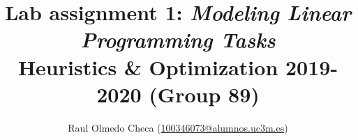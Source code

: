 \documentclass[a4paper,usenames,dvipsnames,table]{report}
\begin{document}
\title{
    {\Huge \textbf{Lab assignment 1: \textit{Modeling Linear Programming Tasks}\\}}
    {\small Heuristics \& Optimization 2019-2020 (Group 89)}
}
\author{
    Raul Olmedo Checa ({\normalsize \href{mailto:100346073@alumnos.uc3m.es}{100346073@alumnos.uc3m.es}})\\
}
\maketitle




\tableofcontents








\newpage
\end{document}
